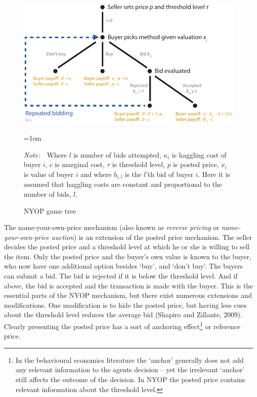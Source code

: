 \documentclass[a4paper,12pt]{article}
\newcommand{\Figtext}[1]{%
	\begin{tablenotes}[para,flushleft]
		\hangindent=1em
		\footnotesize
		\raggedright
		#1
	\end{tablenotes}
}
\newcommand{\Fignote}[1]{\Figtext{\emph{Note:~}~#1}}
\begin{document}
	\begin{figure}
	        \centering
	        \caption{NYOP game tree}
	        \includegraphics[width=\textwidth]{Figures/NYOP_GameTree}
			\label{fig:game_tree}
			\Fignote{Where $l$ is number of bids attempted, $\kappa_i$ is haggling cost of buyer $i$, $c$ is marginal cost, $\tau$ is threshold level, $p$ is posted price, $x_i$ is value of buyer $i$ and where $b_{i,l}$ is the $l$'th bid of buyer $i$. Here it is assumed that haggling costs are constant and proportional to the number of bids, $l$.}
	\end{figure}

	The name-your-own-price mechanism (also known as {\it reverse pricing} or {\it name-your-own-price auction}) is an extension of the posted price mechanism. The seller decides the posted price and a threshold level at which he or she is willing to sell the item. Only the posted price and the buyer's own value is known to the buyer, who now have one additional option besides `buy', and `don't buy'. The buyers can submit a bid. The bid is rejected if it is below the threshold level. And if above, the bid is accepted and the transaction is made with the buyer. This is the essential parts of the NYOP mechanism, but there exist numerous extensions and modifications. One modification is to hide the posted price, but having less cues about the threshold level reduces the average bid (Shapiro and Zillante, 2009). Clearly presenting the posted price has a sort of anchoring effect\footnote{In the behavioural economics literature the `anchor' generally does not add any relevant information to the agents decision -- yet the irrelevant `anchor' still affects the outcome of the decision. In NYOP the posted price contains relevant information about the threshold level.} or reference price. 
	
\end{document}
